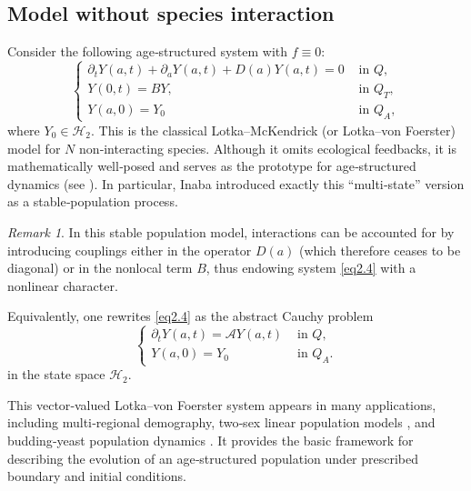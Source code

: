 \documentclass[10pt, a4paper]{amsart}
\theoremstyle{plain}
\theoremstyle{definition}
\theoremstyle{remark}
\newtheorem{remark}[lemma]{Remark}
\numberwithin{equation}{section}
\begin{document}
\subsection{Model without species interaction}
Consider the following age‑structured system with $f\equiv0$:
 \begin{equation}\label{eq2.4}
\left\lbrace 
\begin{array}{ll}
\partial_tY(a,t)+\partial_aY(a,t)+D(a)Y(a,t)=0 &\text{ in }Q,\\  
Y(0,t)=BY, &\text{ in } Q_T,\\
Y(a,0)=Y_0 &\text{ in } Q_A,
\end{array}
\right.
\end{equation} 
 where $Y_0\in\mathcal H_2$. This is the classical Lotka–McKendrick (or Lotka–von Foerster) model for $N$ non‑interacting species.  Although it omits ecological feedbacks, it is mathematically well‑posed and serves as the prototype for age‑structured dynamics (see \cite{ref25, ref28, ref26, ref69, ref30}).  In particular, Inaba \cite[Proposition 2.4]{ref28} introduced exactly this “multi‑state” version as a stable‑population process.
\begin{remark}
In this stable population model, interactions can be accounted for by introducing couplings either in the operator $D(a)$ (which therefore ceases to be diagonal) or in the nonlocal term $B$, thus endowing system \eqref{eq2.4} with a nonlinear character.    
\end{remark}
Equivalently, one rewrites \eqref{eq2.4} as the abstract Cauchy problem
\begin{equation}\label{eq2.5}
\left\lbrace 
\begin{array}{ll}
\partial_tY(a,t)=\mathcal{A}Y(a,t) &\text{ in }Q,\\  
Y(a,0)=Y_0 &\text{ in } Q_A.
\end{array}
\right.
\end{equation}  
 in the state space $\mathcal H_2$.  %

 This vector‑valued Lotka–von Foerster system appears in many applications, including multi‑regional demography, two‑sex linear population models \cite{ref54}, and budding‑yeast population dynamics \cite{ref28}.  It provides the basic framework for describing the evolution of an age‐structured population under prescribed boundary and initial conditions.
\end{document}
